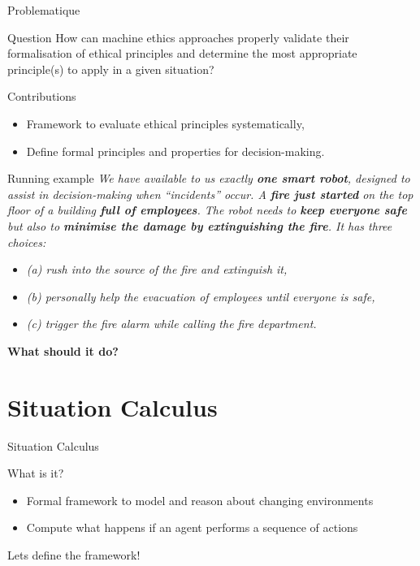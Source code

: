 \documentclass[compress,xcolor=table]{beamer}
\begin{document}
\begin{frame}{Problematique}
    \begin{alertblock}{Question}
    How can machine ethics approaches properly validate their formalisation of ethical principles and determine the most appropriate principle(s) to apply in a given situation?
    \end{alertblock}
    \pause
    \begin{block}{Contributions}
        \begin{itemize}
            \item Framework to evaluate ethical principles systematically,
            \item Define formal principles and properties for decision-making.
        \end{itemize}
    \end{block}
\end{frame}

\begin{frame}{Running example}
    \textit{We have available to us exactly \textbf{one smart robot}, designed to assist in decision-making when “incidents” occur. A \textbf{fire just started} on the top floor of a building \textbf{full of employees}. The robot needs to \textbf{keep everyone safe} but also to \textbf{minimise the damage by extinguishing the fire}. It has three choices:}
    \begin{itemize}
        \item \textit{(a) rush into the source of the fire and extinguish it,} 
        \item \textit{(b) personally help the evacuation of employees until everyone is safe,}
        \item \textit{(c) trigger the fire alarm while calling the fire department.}
    \end{itemize}

    \textbf{What should it do?}
\end{frame}

\section{Situation Calculus}

\begin{frame}{Situation Calculus}
    \begin{block}{What is it?}
    \begin{itemize}
        \item Formal framework to model and reason about changing environments 
        \pause
        \item Compute what happens if an agent performs a sequence of actions
    \end{itemize}
    \end{block}
    \pause
    Lets define the framework!
\end{frame}
\end{document}
